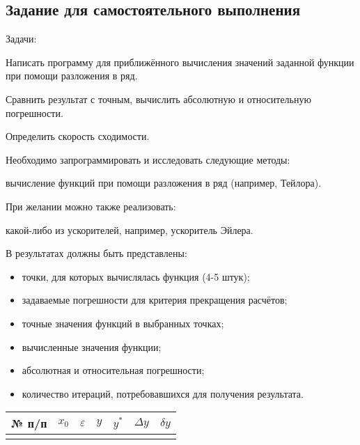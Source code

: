 %
%



\subsection{Задание для самостоятельного выполнения}

Задачи:

Написать программу для приближённого вычисления значений заданной
функции при помощи разложения в ряд.

Сравнить результат с точным, вычислить абсолютную и относительную
погрешности.

Определить скорость сходимости.

Необходимо запрограммировать и исследовать следующие методы:

вычисление функций при помощи разложения в ряд (например, Тейлора).

При желании можно также реализовать:

какой-либо из ускорителей, например, ускоритель Эйлера.

В результатах должны быть представлены:
\begin{itemize}
\item точки, для которых вычислялась функция (4-5 штук);
\item задаваемые погрешности для критерия прекращения расчётов;
\item точные значения функций в выбранных точках;
\item вычисленные значения функции;
\item абсолютная и относительная погрешности;
\item количество итераций, потребовавшихся для получения результата.
\end{itemize}
\begin{center}
\begin{tabular}{|c|c|c|c|c|c|c|}
\hline 
№ п/п & $x_{0}$ & $\varepsilon$ & $y$ & $y^{*}$ & $\Delta y$ & $\delta y$\tabularnewline
\hline 
\hline 
 &  &  &  &  &  & \tabularnewline
\hline 
\end{tabular}
\par\end{center}

